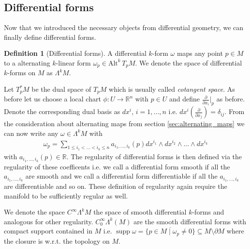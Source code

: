 \documentclass[12pt,a4paper]{article}
\numberwithin{equation}{subsection}
\numberwithin{lemma}{subsection}
\theoremstyle{definition}
\newtheorem{definition}[lemma]{Definition}
\DeclareMathOperator{\supp}{supp}
\newcommand{\alternating}[2]{ {\text{Alt}^{#1}\,#2} }
\newcommand{\smoothcompforms}[2]{C_0^\infty \Lambda^{#1}(#2)}
\newcommand{\real}{\mathbb{R}}
\begin{document}
\subsection{Differential forms}\label{sec:differential_forms}
Now that we introduced the necessary objects from differential geometry, 
we can finally define differential forms.
\begin{definition}[Differential forms]
    A differential $k$-form $\omega$ maps any point $p \in M$ to a 
    alternating $k$-linear form $\omega_p \in \alternating{k}{T_p M}$.
    We denote the space of differential $k$-forms on $M$ as $\Lambda^k M$.
\end{definition}

Let $T_p^* M$ be the dual space of $T_p M$ which is usually called 
\textit{cotangent space}.
As before let us choose a local chart $\phi: U \rightarrow \real^n$ with 
$p \in U$ and define $\frac{\partial}{\partial x_i}|_p$ as before. 
Denote the corresponding
dual basis as $dx^i$, $i = 1,...,n$ i.e. 
$dx^i(\frac{\partial}{\partial x_j}) = \delta_{ij}$. 
From the consideration about
alternating maps from section \ref{sec:alternating_maps} we can now write any 
$\omega \in \Lambda^k M$ with 
\begin{align*}
    \omega_p = \sum\limits_{1\leq i_1 < ... < i_k \leq n} 
        a_{i_1,...,i_k}(p) dx^{i_1} \wedge dx^{i_2} \wedge ... \wedge dx^{i_k}
\end{align*}
with $a_{i_1,...,i_k}(p) \in \real$. The regularity of differential forms 
is then defined via the regularity of these coefficents i.e. we call 
a differential form smooth if all the $a_{i_1,...,i_k}$ are smooth 
and we call a differential form differentiable if all the $a_{i_1,...,i_k}$
are differentiable and so on. These definition of regularity again require 
the manifold to be sufficiently regular as well.

We denote the space $C^\infty \Lambda^k M$ the 
space of smooth differential $k$-forms and analogous for other regularity.
$\smoothcompforms{k}{M}$ are the smooth differential forms
with compact support contained in $M$ i.e. 
$\supp \omega = \overline{\{ p \in M \mid \omega_p \neq 0  \}} 
\subseteq M \setminus \partial M$ where the closure is w.r.t. 
the topology on $M$.
\end{document}
